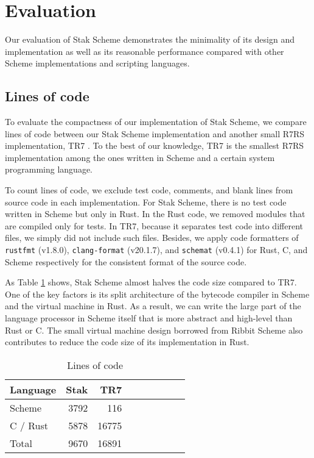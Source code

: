 \documentclass[sigplan, anonymous, review]{acmart}
\begin{document}
\section{Evaluation} \label{evaluation}

Our evaluation of Stak Scheme demonstrates the minimality of its design and
implementation as well as its reasonable performance compared with
other Scheme implementations and scripting languages.

\subsection{Lines of code}

To evaluate the compactness of our implementation of Stak Scheme,
we compare lines of code between our Stak Scheme implementation and
another small R7RS implementation, TR7 \cite{tr7}.
To the best of our knowledge, TR7 is the smallest R7RS implementation
among the ones written in Scheme and a certain system programming language.

To count lines of code, we exclude test code, comments, and blank
lines from source code in each implementation.
For Stak Scheme, there is no test code written in Scheme but only in Rust.
In the Rust code, we removed modules that are compiled only for tests.
In TR7, because it separates test code into different files, we simply did not
include such files.
Besides, we apply code formatters of \texttt{rustfmt} (v1.8.0),
\texttt{clang-format} (v20.1.7), and \texttt{schemat} (v0.4.1) for
Rust, C, and Scheme respectively for the consistent format of the source code.

As Table \ref{table:loc} shows, Stak Scheme almost
halves the code size compared to TR7.
One of the key factors is its split architecture of the bytecode
compiler in Scheme and the virtual machine in Rust.
As a result, we can write the large part of the language processor in Scheme
itself that is more abstract and high-level than Rust or C.
The small virtual machine design borrowed from Ribbit Scheme also
contributes to reduce the code size of its implementation in Rust.

\begin{table}
  \begin{center}
    \caption{Lines of code}
    \label{table:loc}
    \begin{tabular}{l|rrrrrrrr}
      \hline
      Language & Stak & TR7  \\
      \hline
      Scheme & 3792 & 116 \\
      C / Rust & 5878 & 16775 \\
      Total & 9670 & 16891 \\
      \hline
    \end{tabular}
  \end{center}
\end{table}
\end{document}
